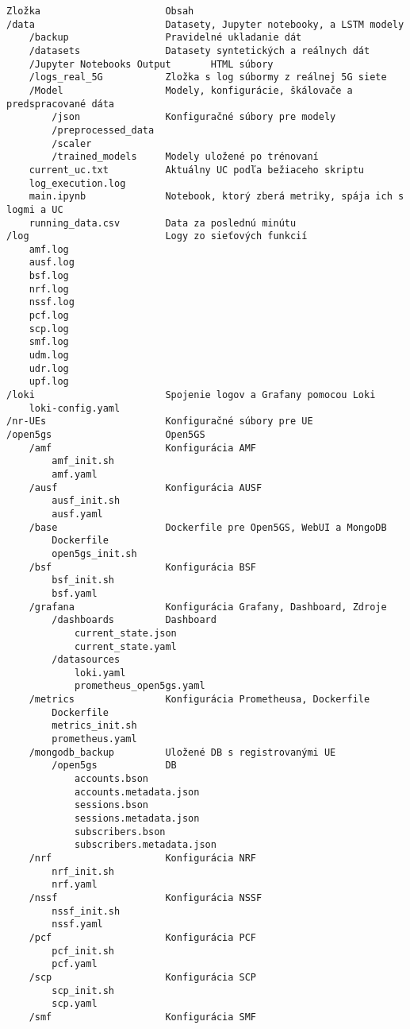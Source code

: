\begin{verbatim}
Zložka                      Obsah
/data                       Datasety, Jupyter notebooky, a LSTM modely
    /backup                 Pravidelné ukladanie dát
    /datasets               Datasety syntetických a reálnych dát
    /Jupyter Notebooks Output       HTML súbory
    /logs_real_5G           Zložka s log súbormy z reálnej 5G siete
    /Model                  Modely, konfigurácie, škálovače a predspracované dáta
        /json               Konfiguračné súbory pre modely
        /preprocessed_data
        /scaler
        /trained_models     Modely uložené po trénovaní
    current_uc.txt          Aktuálny UC podľa bežiaceho skriptu
    log_execution.log
    main.ipynb              Notebook, ktorý zberá metriky, spája ich s logmi a UC
    running_data.csv        Data za poslednú minútu
/log                        Logy zo sieťových funkcií
    amf.log
    ausf.log
    bsf.log
    nrf.log
    nssf.log
    pcf.log
    scp.log
    smf.log
    udm.log
    udr.log
    upf.log
/loki                       Spojenie logov a Grafany pomocou Loki
    loki-config.yaml
/nr-UEs                     Konfiguračné súbory pre UE
/open5gs                    Open5GS
    /amf                    Konfigurácia AMF
        amf_init.sh
        amf.yaml
    /ausf                   Konfigurácia AUSF
        ausf_init.sh
        ausf.yaml
    /base                   Dockerfile pre Open5GS, WebUI a MongoDB
        Dockerfile
        open5gs_init.sh
    /bsf                    Konfigurácia BSF
        bsf_init.sh
        bsf.yaml
    /grafana                Konfigurácia Grafany, Dashboard, Zdroje
        /dashboards         Dashboard
            current_state.json
            current_state.yaml
        /datasources
            loki.yaml
            prometheus_open5gs.yaml
    /metrics                Konfigurácia Prometheusa, Dockerfile
        Dockerfile
        metrics_init.sh
        prometheus.yaml
    /mongodb_backup         Uložené DB s registrovanými UE
        /open5gs            DB
            accounts.bson
            accounts.metadata.json
            sessions.bson
            sessions.metadata.json
            subscribers.bson
            subscribers.metadata.json
    /nrf                    Konfigurácia NRF
        nrf_init.sh
        nrf.yaml
    /nssf                   Konfigurácia NSSF
        nssf_init.sh
        nssf.yaml
    /pcf                    Konfigurácia PCF
        pcf_init.sh
        pcf.yaml
    /scp                    Konfigurácia SCP
        scp_init.sh
        scp.yaml
    /smf                    Konfigurácia SMF

\end{verbatim}
